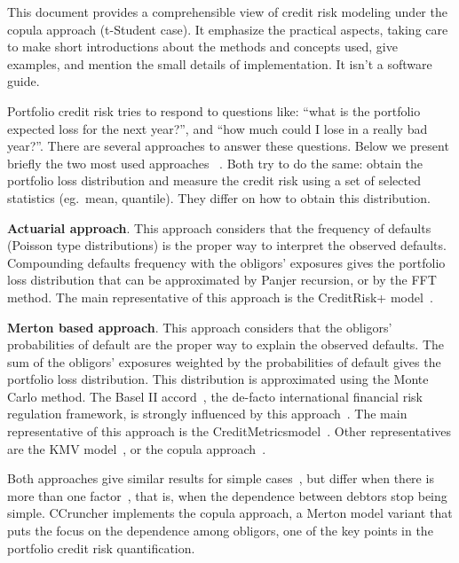 \documentclass[11pt,fleqn]{book} %
\begin{document}
This document provides a comprehensible view of credit risk modeling under the
copula approach (t-Student case). It emphasize the practical aspects, taking 
care to make short introductions about the methods and concepts used, give 
examples, and mention the small details of implementation. It isn't a software
guide.

Portfolio credit risk tries to respond to questions like: \enquote{what is the 
portfolio expected loss for the next year?}, and \enquote{how much could I 
lose in a really bad year?}. There are several approaches to answer these 
questions. Below we present briefly the two most used approaches~\cite{crouhy:2000} 
\cite[chap. 2.4]{bluhm:2002}. Both try to do the same: obtain the portfolio 
loss distribution and measure the credit risk using a set of selected 
statistics (eg.\ mean, quantile). They differ on how to obtain this 
distribution. 

\textbf{Actuarial approach}. This approach considers that the frequency 
of defaults (Poisson type distributions) is the proper way to interpret the 
observed defaults. Compounding defaults frequency with the obligors' exposures 
gives the portfolio loss distribution that can be approximated by Panjer 
recursion, or by the FFT method. The main representative of this approach is 
the CreditRisk+ model~\cite{creditrisk+:1997}.

\textbf{Merton based approach}. This approach considers that the obligors' 
probabilities of default are the proper way to explain the observed defaults.
The sum of the obligors' exposures weighted by the probabilities of default 
gives the portfolio loss distribution. This distribution is approximated 
using the Monte Carlo method. The Basel II accord~\cite{basel2:2006}, the 
de-facto international financial risk regulation framework, is strongly 
influenced by this approach~\cite{cespedes:2002}. The main representative of 
this approach is the CreditMetrics\texttrademark model~\cite{cmetrics:1997}. 
Other representatives are the KMV model~\cite{kmv:2003}, or the copula 
approach~\cite{li:2000}. 

Both approaches give similar results for simple cases~\cite{koyluoglu:1998},
but differ when there is more than one factor~\cite{bluhm:2001}, that is, 
when the dependence between debtors stop being simple.
CCruncher implements the copula approach, a Merton model variant that puts 
the focus on the dependence among obligors, one of the key points in the 
portfolio credit risk quantification.
\end{document}
